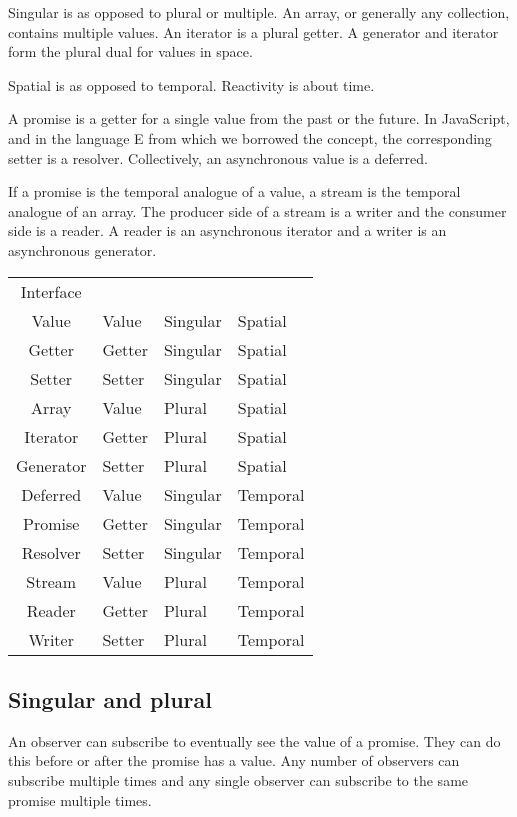 Singular is as opposed to plural or multiple. An array, or generally any collection, contains multiple values. An iterator is a plural getter. A generator and iterator form the plural dual for values in space.

Spatial is as opposed to temporal. Reactivity is about time.

A promise is a getter for a single value from the past or the future. In JavaScript, and in the language E from which we borrowed the concept, the corresponding setter is a resolver. Collectively, an asynchronous value is a deferred.

If a promise is the temporal analogue of a value, a stream is the temporal analogue of an array. The producer side of a stream is a writer and the consumer side is a reader. A reader is an asynchronous iterator and a writer is an asynchronous generator.

\begin{tabular}{| c | l | l | l |}
Interface & & & \\			
Value & Value	& Singular &	Spatial\\
Getter &	Getter	& Singular	& Spatial\\
Setter &	Setter &	Singular	&Spatial\\
Array &	Value &	Plural &	Spatial\\
Iterator &	Getter	& Plural &	Spatial\\
Generator	 & Setter	& Plural &	Spatial\\
Deferred &	Value	& Singular & 	Temporal\\
Promise &	Getter	&Singular&	Temporal\\
Resolver &	Setter&	Singular&	Temporal\\
Stream	&Value	&Plural&	Temporal\\
Reader	&Getter	&Plural&	Temporal\\
Writer	&Setter&	Plural&	Temporal\\
\end{tabular}



\subsection{Singular and plural}

An observer can subscribe to eventually see the value of a promise. They can do this before or after the promise has a value. Any number of observers can subscribe multiple times and any single observer can subscribe to the same promise multiple times.

